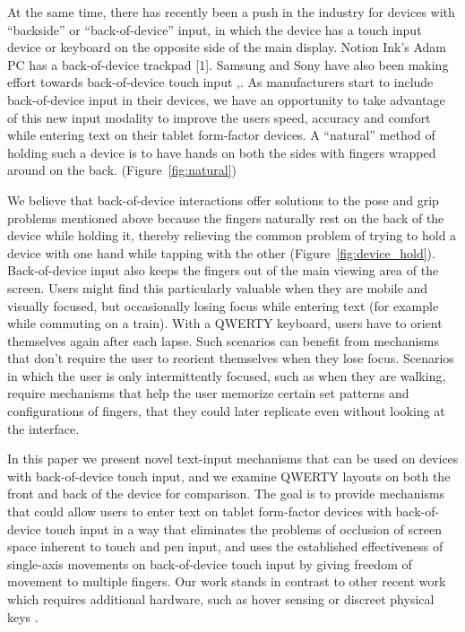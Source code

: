 At the same time, there has recently been a push in the industry for
devices with ``backside'' or ``back-of-device'' input, in which the
device has a touch input device or keyboard on the opposite side of
the main display. Notion Ink's Adam PC has a back-of-device trackpad
[1]. Samsung and Sony have also been making effort towards back-of-device
touch input \cite{Samsung},\cite{Sony}. As manufacturers start to
include back-of-device input in their devices, we have an opportunity to
take advantage of this new input modality to improve the users speed,
accuracy and comfort while entering text on their tablet form-factor
devices. A ``natural'' method of holding such a device is to have hands
on both the sides with fingers wrapped around on the
back. \cite{Wobbrock} (Figure~\ref{fig:natural})

We believe that back-of-device interactions offer solutions to the
pose and grip problems mentioned above because the fingers naturally
rest on the back of the device while holding it, thereby relieving the
common problem of trying to hold a device with one hand while tapping
with the other (Figure~\ref{fig:device_hold}).  Back-of-device input
also keeps the fingers out of the main viewing area of the screen.
Users might find this particularly valuable when they are mobile and
visually focused, but occasionally losing focus while entering text
(for example while commuting on a train).  With a QWERTY keyboard,
users have to orient themselves again after each lapse. Such scenarios
can benefit from mechanisms that don't require the user to reorient
themselves when they lose focus.  Scenarios in which the user is only
intermittently focused, such as when they are walking, require
mechanisms that help the user memorize certain set patterns and
configurations of fingers, that they could later replicate even
without looking at the interface.

In this paper we present novel text-input mechanisms that can be used
on devices with back-of-device touch input, and we examine QWERTY
layouts on both the front and back of the device for comparison. The
goal is to provide mechanisms that could allow users to enter text on
tablet form-factor devices with back-of-device touch input in a way
that eliminates the problems of occlusion of screen space inherent to
touch and pen input, and uses the established effectiveness of
single-axis movements on back-of-device touch input \cite{Wobbrock} by
giving freedom of movement to multiple fingers.  Our work stands in
contrast to other recent work which requires additional hardware, such
as hover sensing \cite{LucidTouch} or discreet physical keys
\cite{RearType}.

